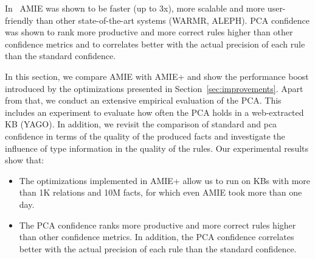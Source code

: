 
In~\cite{amie} AMIE was shown to be faster (up to 3x), more scalable and more user-friendly than other state-of-the-art systems (WARMR, ALEPH).
PCA confidence was shown to rank more productive and more correct rules higher than other confidence metrics and to correlates better
with the actual precision of each rule than the standard confidence.


In this section, we compare AMIE with AMIE+ and show the performance boost introduced
by the optimizations presented in Section~\ref{sec:improvements}.
Apart from that, we conduct  an extensive empirical evaluation of the PCA.
This includes an experiment to evaluate how often the PCA holds in a web-extracted KB (YAGO).
In addition, we revisit the comparison of standard and pca confidence in terms of the quality of the produced facts and investigate the influence of type information in the quality of the rules.
Our experimental results show that:
\begin{itemize}
 \item The optimizations implemented in AMIE+ allow us to run on KBs with more than 1K relations and 10M facts, for which
even AMIE took more than one day.
\item The PCA confidence ranks more productive and more correct rules higher than other confidence metrics. In addition, the PCA confidence correlates better
with the actual precision of each rule than the standard confidence.
\end{itemize}
